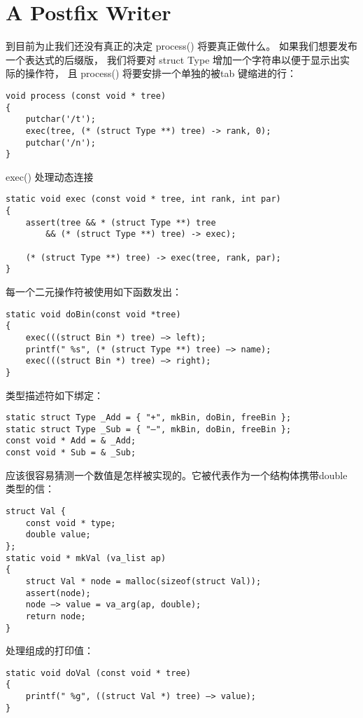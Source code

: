 \section{A Postfix Writer}
 到目前为止我们还没有真正的决定 process() 将要真正做什么。
 如果我们想要发布一个表达式的后缀版，
 我们将要对 struct Type 增加一个字符串以便于显示出实际的操作符，
 且 process() 将要安排一个单独的被tab 键缩进的行：
\begin{lstlisting}
void process (const void * tree)
{
    putchar('/t');
    exec(tree, (* (struct Type **) tree) -> rank, 0);
    putchar('/n');
}
\end{lstlisting}

exec() 处理动态连接
\begin{lstlisting}
static void exec (const void * tree, int rank, int par)
{
    assert(tree && * (struct Type **) tree
        && (* (struct Type **) tree) -> exec);
    
    (* (struct Type **) tree) -> exec(tree, rank, par);
}
\end{lstlisting}

每一个二元操作符被使用如下函数发出：
\begin{lstlisting}
static void doBin(const void *tree)
{
    exec(((struct Bin *) tree) —> left);
    printf(" %s", (* (struct Type **) tree) —> name);
    exec(((struct Bin *) tree) —> right);
}
\end{lstlisting}

类型描述符如下绑定：
\begin{lstlisting}
static struct Type _Add = { "+", mkBin, doBin, freeBin };
static struct Type _Sub = { "—", mkBin, doBin, freeBin };
const void * Add = & _Add;
const void * Sub = & _Sub;
\end{lstlisting}

应该很容易猜测一个数值是怎样被实现的。它被代表作为一个结构体携带double 类型的信：
\begin{lstlisting}
struct Val {
    const void * type;
    double value;
};
static void * mkVal (va_list ap)
{
    struct Val * node = malloc(sizeof(struct Val));
    assert(node);
    node —> value = va_arg(ap, double);
    return node;
}
\end{lstlisting}

处理组成的打印值：
\begin{lstlisting}
static void doVal (const void * tree)
{
    printf(" %g", ((struct Val *) tree) —> value);
}
\end{lstlisting}

